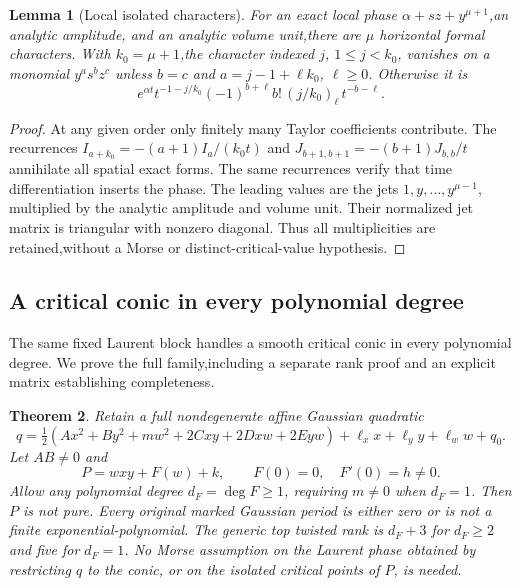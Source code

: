 \documentclass[11pt]{article}
\newtheorem{theorem}{Theorem}[section]
\newtheorem{lemma}[theorem]{Lemma}
\theoremstyle{definition}\newtheorem{definition}[theorem]{Definition}
\theoremstyle{remark}\newtheorem{remark}[theorem]{Remark}
\begin{document}
\begin{lemma}[Local isolated characters]\label{lem:isolatedcharacters}
For an exact local phase $\alpha+sz+y^{\mu+1}$,an analytic amplitude,
and an analytic volume unit,there are $\mu$ horizontal formal
characters. With $k_0=\mu+1$,the character indexed $j$, $1\le j<k_0$,
vanishes on a monomial $y^a s^b z^c$ unless $b=c$ and
$a=j-1+\ell k_0$, $\ell\ge0$. Otherwise it is
\begin{equation}\label{eq:ordinarycharacters}
 e^{\alpha t}t^{-1-j/k_0}
       (-1)^{b+\ell}b!\,(j/k_0)_\ell\,t^{-b-\ell}.
\end{equation}
\end{lemma}
\begin{proof}
At any given order only finitely many Taylor coefficients contribute.
The recurrences $I_{a+k_0}=-(a+1)I_a/(k_0t)$ and
$J_{b+1,b+1}=-(b+1)J_{b,b}/t$ annihilate all spatial exact forms.
The same recurrences verify that time differentiation inserts the
phase. The leading values are the jets $1,y,\ldots,y^{\mu-1}$,
multiplied by the analytic amplitude and volume unit. Their normalized
jet matrix is triangular with nonzero diagonal. Thus all multiplicities
are retained,without a Morse or distinct-critical-value hypothesis.
\end{proof}
\subsection{A critical conic in every polynomial degree}
\label{sec:hyperbolicsuspension}

The same fixed Laurent block handles a smooth critical conic in every
polynomial degree. We prove the full family,including a separate
rank proof and an explicit matrix establishing completeness.

\begin{theorem}\label{thm:hyperbolicsuspension}
Retain a full nondegenerate affine Gaussian quadratic
\[
 q=\tfrac12(Ax^2+By^2+mw^2+2Cxy+2Dxw+2Eyw)
                     +\ell_x x+\ell_y y+\ell_w w+q_0.
\]
Let $AB\ne0$ and
\[
 P=wxy+F(w)+k,\qquad F(0)=0,\quad F'(0)=h\ne0.
\]
Allow any polynomial degree $d_F=\deg F\ge1$, requiring $m\ne0$
when $d_F=1$. Then $P$ is not pure. Every original marked Gaussian
period is either zero or is not a finite exponential-polynomial.
The generic top twisted rank is $d_F+3$ for $d_F\ge2$ and five for
$d_F=1$. No Morse assumption on the Laurent phase obtained by
restricting $q$ to the conic, or on the isolated critical points of
$P$, is needed.
\end{theorem}
\end{document}

